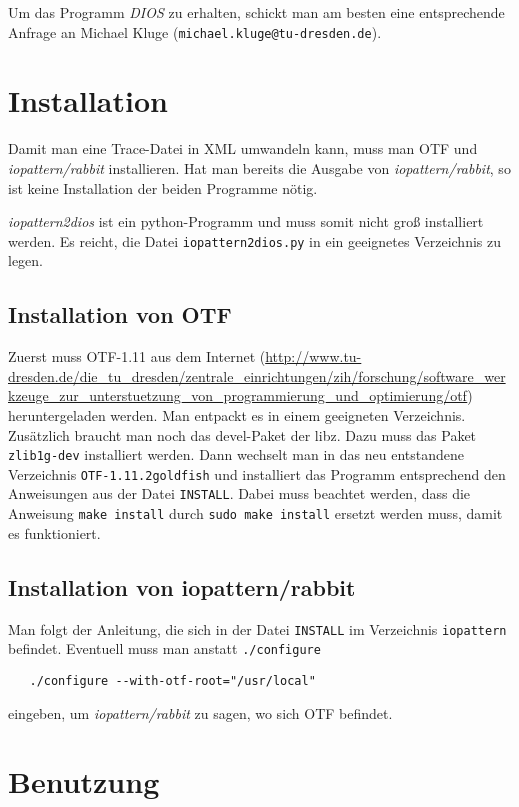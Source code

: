 \documentclass{scrartcl}
\newcommand\email[1]{\texttt{#1}}
\begin{document}
Um das Programm \emph{DIOS} zu erhalten, schickt man am besten eine 
entsprechende Anfrage an Michael Kluge (\email{michael.kluge@tu-dresden.de}).
\section{Installation} %
Damit man eine Trace-Datei in XML umwandeln kann, muss man OTF und 
\emph{iopattern/rabbit} installieren. Hat man bereits die Ausgabe von 
\emph{iopattern/rabbit}, so ist keine Installation der beiden Programme nötig. 

\emph{iopattern2dios} ist ein python-Programm und muss somit nicht groß 
installiert werden. Es reicht, die Datei \texttt{iopattern2dios.py} 
in ein geeignetes Verzeichnis zu legen.
\subsection{Installation von OTF} %
Zuerst muss OTF-1.11 aus dem Internet 
(\url{http://www.tu-dresden.de/die_tu_dresden/zentrale_einrichtungen/zih/forschung/software_werkzeuge_zur_unterstuetzung_von_programmierung_und_optimierung/otf}) 
heruntergeladen werden. Man entpackt es in einem geeigneten Verzeichnis. 
Zusätzlich braucht man noch das devel-Paket der libz. Dazu muss das Paket
\texttt{zlib1g-dev} installiert werden. Dann 
wechselt man in das neu entstandene Verzeichnis \texttt{OTF-1.11.2goldfish}
und installiert das Programm entsprechend den Anweisungen aus der Datei
\texttt{INSTALL}. Dabei muss beachtet werden, dass die Anweisung 
\texttt{make install} durch \texttt{sudo make install} ersetzt werden muss,
damit es funktioniert.

\subsection{Installation von iopattern/rabbit} %
Man folgt der Anleitung, die sich in der Datei \texttt{INSTALL} im Verzeichnis
\texttt{iopattern} befindet. Eventuell muss man anstatt \texttt{./configure}
\begin{verbatim}
   ./configure --with-otf-root="/usr/local"
\end{verbatim}
eingeben, um \emph{iopattern/rabbit} zu sagen, wo sich OTF befindet.
\section{Benutzung} %
\end{document}
